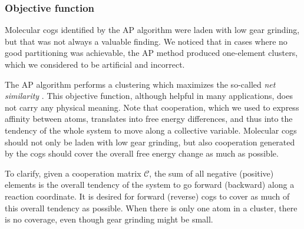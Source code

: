 \documentclass[a4paper,11pt,twoside]{book}%
\begin{document}
\subsubsection{Objective function}\label{sec:objective}
Molecular cogs identified by the AP algorithm were laden with low gear grinding, but that was not always a valuable finding. 
We noticed that in cases where no good partitioning was achievable, the AP method produced one-element clusters, which we considered to be artificial and incorrect. 

The AP algorithm performs a clustering which maximizes the so-called \emph{net similarity} \cite{frey2007clustering}.
This objective function, although helpful in many applications, does not carry any physical meaning.
Note that cooperation, which we used to express affinity between atoms, translates into free energy differences, and thus into the tendency of the whole system to move along a collective variable.
Molecular cogs should not only be laden with low gear grinding, but also cooperation generated by the cogs should cover the overall free energy change as {\color{black}much} as possible.

To clarify, given a cooperation matrix $\mathcal{C}$, the sum of all negative (positive) elements is the overall tendency of the system to go forward (backward) along a reaction coordinate.
It is desired for forward (reverse) cogs to cover as much of this overall tendency as possible.
When there is only one atom in a cluster, there is no coverage, even though gear grinding might be small.
\end{document}
